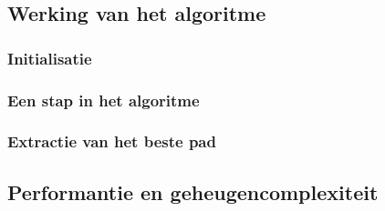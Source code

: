 \subsection{Werking van het algoritme}

\subsubsection{Initialisatie}
\subsubsection{Een stap in het algoritme}
\subsubsection{Extractie van het beste pad}

\subsection{Performantie en geheugencomplexiteit}

